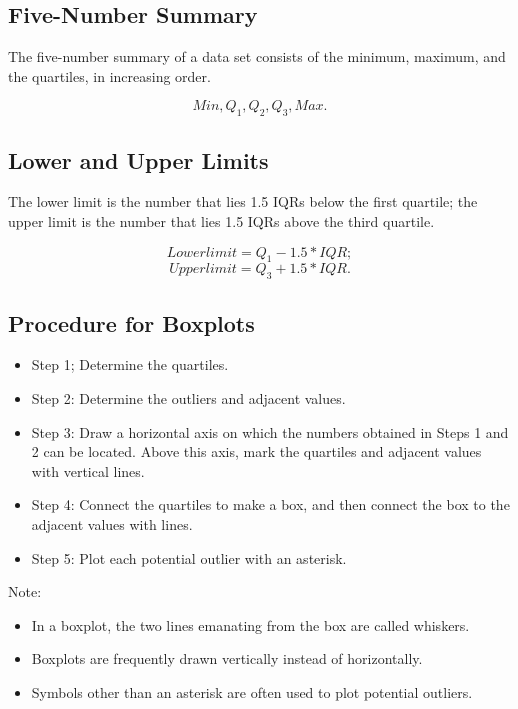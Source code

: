 \documentclass[12pt]{article}
\begin{document}
        \subsection*{Five-Number Summary}
            The five-number summary of a data set consists of the minimum, maximum, and the quartiles,
            in increasing order.
            \begin{center}
                \[
                    Min, Q_1, Q_2, Q_3, Max.    
                \]
            \end{center}
        \subsection*{Lower and Upper Limits}
            The lower limit is the number that lies 1.5 IQRs below the first quartile; the upper limit
            is the number that lies 1.5 IQRs above the third quartile.
            \begin{center}
                \[
                    Lower limit = Q_1 - 1.5 * IQR;
                \]
                \[
                    Upper limit = Q_3 + 1.5 * IQR.  
                \]
            \end{center}
        \subsection*{Procedure for Boxplots}
            \begin{itemize}
                \item{Step 1;} Determine the quartiles.
                \item{Step 2:} Determine the outliers and adjacent values.
                \item{Step 3:} Draw a horizontal axis on which the numbers obtained in Steps 1 and 2 can
                be located. Above this axis, mark the quartiles and adjacent values with vertical lines.
                \item{Step 4:} Connect the quartiles to make a box, and then connect the box to the
                adjacent values with lines.
                \item{Step 5:} Plot each potential outlier with an asterisk.
            \end{itemize}
            Note:
            \begin{itemize}
                \item In a boxplot, the two lines emanating from the box are called whiskers.
                \item Boxplots are frequently drawn vertically instead of horizontally.
                \item Symbols other than an asterisk are often used to plot potential outliers.
            \end{itemize}
\end{document}
